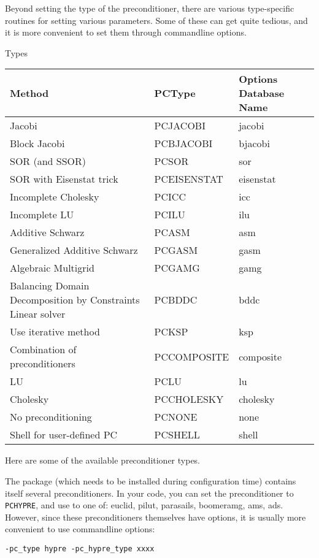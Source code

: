 Beyond setting the type of the preconditioner, there are various
type-specific routines for setting various parameters. Some of these
can get quite tedious, and it is more convenient to set them through
commandline options.

 {Types}
\label{sec:petsc-prec-list}

\begin{tabular}{p{2in}ll}
\toprule
Method&PCType&Options Database Name\\
\midrule
Jacobi&PCJACOBI&jacobi\\
Block Jacobi&PCBJACOBI&bjacobi\\
SOR (and SSOR)&PCSOR&sor\\
SOR with Eisenstat trick&PCEISENSTAT&eisenstat\\
Incomplete Cholesky&PCICC&icc\\
Incomplete LU&PCILU&ilu\\
Additive Schwarz&PCASM&asm\\
Generalized Additive Schwarz&PCGASM&gasm\\
Algebraic Multigrid&PCGAMG&gamg\\
Balancing Domain Decomposition by Constraints Linear solver&PCBDDC&bddc\\
Use iterative method&PCKSP&ksp\\
Combination of preconditioners&PCCOMPOSITE&composite\\
LU&PCLU&lu\\
Cholesky&PCCHOLESKY&cholesky\\
No preconditioning&PCNONE&none\\
Shell for user-defined PC&PCSHELL&shell  \\
\bottomrule
\end{tabular}

Here are some of the available preconditioner types.

The  package
(which needs to be installed during configuration time)
contains itself several preconditioners.
In your code, you can set the preconditioner to \lstinline{PCHYPRE},
and use  to one of:
euclid, pilut, parasails, boomeramg, ams, ads.
However, since these preconditioners themselves have options,
it is usually more convenient to use commandline options:
\begin{verbatim}
-pc_type hypre -pc_hypre_type xxxx
\end{verbatim}

\begin{comment}
  hypre with drop tolerance:

  You can run with -help to see this:

 -pc_hypre_euclid_level <now -2 : formerly -2>: Factorization levels (None)
  -pc_hypre_euclid_droptolerance <0. : 0.>: Drop tolerance for ILU(k) in Euclid (None)
  -pc_hypre_euclid_bj: <FALSE : FALSE> Use Block Jacobi for ILU in Euclid (None)
\end{comment}

